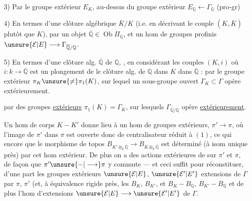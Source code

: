  3) Par le groupe extérieur $E_K$, au-dessus du groupe extérieur $E_{\mathbb Q}\longleftarrow\Gamma_{\mathbb Q}$ (pro-gr)

4) En termes d'une clôture algébrique $\bar K/K$ (i.e. en décrivant le couple $(K,\bar K)$ plutôt que $K$), par un objet $\overline{\mathbb Q}\in\operatorname{Ob}\Pi_{\mathbb Q}$, et un hom de groupes profinis $\unsure{\mathcal E|E}\longrightarrow\Gamma_{\overline{\mathbb Q}/\mathbb Q}$.

5) En termes d'une clôture alg.  $\overline{\mathbb Q}$ de $\mathbb Q$, ,  en considérant les couples $(K,i)$ où $i:k\longrightarrow\overline{\mathbb Q}$ est un plongement de le clôture alg. de $\mathbb Q$ dans $K$ dans $\overline{\mathbb Q}$ :  par le groupe extérieur $\pi_K\unsure{\neq}\pi_1(K)$, sur lequel un sous-groupe ouvert $\Gamma_K\subset\Gamma$ opère extérieurement.


par des groupes  \uline{extérieurs} $\pi_1(K)=\Gamma_K$, sur lesquels  $\Gamma_{\overline{\mathbb Q}/\mathbb Q}$ opère \uline{extérieurement}.

Un hom de corps $K-K'$ donne lieu à un hom de groupes extérieurs,
 $\pi'\longrightarrow\pi$, où l'image de $\pi'$ dans $\pi$ est ouverte donc de centralisateur réduit à $(1)$, ce qui  encore que le morphisme de topos $B_{K'\otimes_k\overline{\mathbb Q}}\longrightarrow B_{K\otimes_k\overline{\mathbb Q}}$ est déterminé (à isom unique près) par cet hom extérieur. De plus on a des actions extérieures de  sur $\pi'$ et $\pi$, de façon que $\pi'\unsure{-|\longrightarrow}\pi$ y commute --- et ceci suffit pour réconstituer, d'une part les groupes extérieurs $\unsure{\mathcal E|E}$, $\unsure{\mathcal E'|E'}$ extensions  de $\Gamma$ par $\pi$, $\pi'$ (et, à équivalence rigide près, les $B_K$, $B_{K'}$, et $B_K-B_{\mathbb Q}$, $B_{K'}-B_{\mathbb Q}$ et de plus l'hom d'extensions  $\unsure{\mathcal E|E}\longrightarrow\unsure{\mathcal E'|E'}$ de $\Gamma$.


